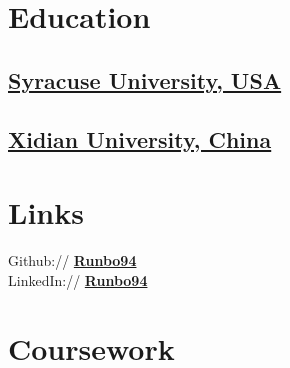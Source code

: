 \documentclass[letterpaper]{deedy-resume} %
\begin{document}
\begin{minipage}[t]{0.33\textwidth} %


\section{Education} 

\subsection{\href{https://www.syracuse.edu/}{Syracuse University, USA}}


\sectionspace %



\subsection{\href{http://en.xidian.edu.cn/}{Xidian University, China}}

\sectionspace %


\section{Links} 

Github:// \href{https://github.com/runbo94}{\bf Runbo94} \\
LinkedIn:// \href{https://www.linkedin.com/in/runbo94}{\bf Runbo94} \\

\sectionspace %


\section{Coursework}


\end{minipage}
\end{document}
